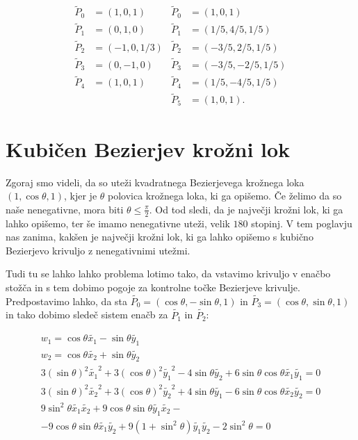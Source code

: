 \documentclass[a4paper,12pt]{article}
\begin{document}
\begin{align*}
\tilde{P}_0 &= (1,0, 1) & \tilde{P}_0 &= (1,0, 1)\\
\tilde{P}_1 &= (0, 1, 0) &\tilde{P}_1 &= (1/5, 4/5, 1/5)\\
\tilde{P}_2 &= (-1, 0, 1/3) &\tilde{P}_2 &= (-3/5, 2/5, 1/5)\\
\tilde{P}_3 &= (0, -1, 0) &\tilde{P}_3 &= (-3/5, -2/5, 1/5)\\
\tilde{P}_4 &= (1, 0, 1) & \tilde{P}_4 &= (1/5, -4/5, 1/5)\\
& & \tilde{P}_5 &= (1, 0, 1).
\end{align*}

\section{Kubičen Bezierjev krožni lok}

Zgoraj smo videli, da so uteži kvadratnega Bezierjevega krožnega loka $(1, \cos \theta, 1)$, kjer je $\theta$ polovica krožnega loka, ki ga opišemo. Če želimo da so naše nenegativne, mora biti $\theta \leq \frac{\pi}{2}$. Od tod sledi, da je največji krožni lok, ki ga lahko opišemo, ter še imamo nenegativne uteži, velik $180$ stopinj. V tem poglavju nas zanima, kakšen je največji krožni lok, ki ga lahko opišemo s kubično Bezierjevo krivuljo z nenegativnimi utežmi.

Tudi tu se lahko lahko problema lotimo tako, da vstavimo krivuljo v enačbo stožča in s tem dobimo pogoje za kontrolne točke Bezierjeve krivulje. Predpostavimo lahko, da sta $\tilde{P_{0}} = (\cos \theta, -\sin \theta, 1)$ in $\tilde{P_{3}} = (\cos \theta, \sin \theta, 1)$ in tako dobimo sledeč sistem enačb za $\tilde{P_{1}}$ in $\tilde{P_{2}}$:

\begin{align*}
w_{1} = \cos \theta \tilde{x_{1}} - \sin \theta  \tilde{y_{1}} \\
w_{2} = \cos \theta  \tilde{x_{2}} + \sin \theta  \tilde{y_{2}} \\
3(\sin \theta )^{2} \tilde{x_{1}}^2 + 3(\cos \theta )^{2} \tilde{y_{1}}^2 - 4 \sin \theta \tilde{y_{2}} + 6\sin \theta \cos \theta \tilde{x_{1}}\tilde{y_{1}} = 0 \\
3(\sin \theta )^{2} \tilde{x_{2}}^2 + 3(\cos \theta )^{2} \tilde{y_{2}}^2 + 4 \sin \theta \tilde{y_{1}} - 6\sin \theta \cos \theta \tilde{x_{2}}\tilde{y_{2}} = 0 \\
9\sin^{2}\theta \tilde{x_{1}}\tilde{x_{2}} + 9 \cos \theta \sin \theta \tilde{y_{1}}\tilde{x_{2}} -\\ -9\cos \theta \sin \theta \tilde{x_{1}} \tilde{y_{2}} + 9 (1 + \sin^2 \theta) \tilde{y_{1}} \tilde{y_{2}} - 2\sin^2\theta = 0
\end{align*}
\end{document}
